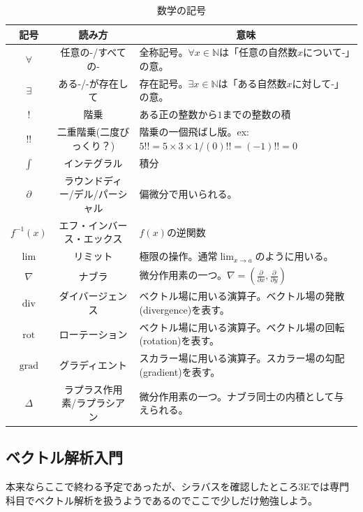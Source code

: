 \documentclass[a4j,dvipdfmx]{jsarticle}
\begin{document}
\begin{table}[h]
                    \caption*{数学の記号}
                    \centering
                    \begin{tabular}{|c|c|l|}\hline
                        記号 & 読み方 & \multicolumn{1}{c|}{意味}\\\hline
                        $\forall$ & 任意の-/すべての- & 全称記号。$\forall x \in \mathbb{N}$は「任意の自然数$x$について-」の意。\\\hline
                        $\exists$ & ある-/-が存在して & 存在記号。$\exists x \in \mathbb{N}$は「ある自然数$x$に対して-」の意。 \\\hline
                        $!$ & 階乗 & ある正の整数から$1$までの整数の積\\\hline
                        $!!$ & 二重階乗(二度びっくり？) & 階乗の一個飛ばし版。ex:\hspace{1mm}$5!!=5\times3\times1/(0)!!=(-1)!!=0$\\\hline
                        $\int$ & インテグラル & 積分 \\\hline
                        $\partial$ & ラウンドディー/デル/パーシャル & 偏微分で用いられる。\\\hline
                        $f^{-1}(x)$ & エフ・インバース・エックス & $f(x)$の逆関数\\\hline
                        $\lim$ & リミット & 極限の操作。通常$\displaystyle\lim_{x\to a}$のように用いる。\\\hline
                        $\nabla$ & ナブラ & 微分作用素の一つ。$\nabla=\left(\frac{\partial}{\partial x},\frac{\partial}{\partial y}\right)$\\\hline
                        $\mathrm{div}$ & ダイバージェンス & ベクトル場に用いる演算子。ベクトル場の発散(divergence)を表す。\\\hline
                        $\mathrm{rot}$ & ローテーション & ベクトル場に用いる演算子。ベクトル場の回転(rotation)を表す。\\\hline
                        $\mathrm{grad}$ & グラディエント & スカラー場に用いる演算子。スカラー場の勾配(gradient)を表す。\\\hline
                        $\varDelta$ & ラプラス作用素/ラプラシアン & 微分作用素の一つ。ナブラ同士の内積として与えられる。\\\hline
                    \end{tabular}
                \end{table}
        \clearpage
        \subsection{ベクトル解析入門}
            本来ならここで終わる予定であったが、シラバスを確認したところ3Eでは専門科目でベクトル解析を扱うようであるのでここで少しだけ勉強しよう。\\
\end{document}
